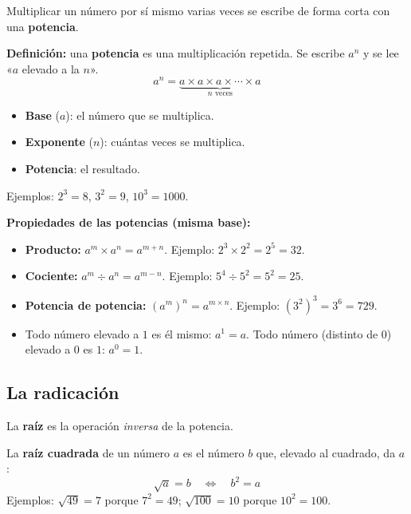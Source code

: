 \documentclass[12pt, letterpaper]{article}
\begin{document}
Multiplicar un número por sí mismo varias veces se escribe de forma corta con una \textbf{potencia}.

\begin{cuadroteoria}
  \textbf{Definición:} una \textbf{potencia} es una multiplicación repetida. Se escribe $a^n$ y se lee «$a$ elevado a la $n$».
  \[
    a^n = \underbrace{a \times a \times a \times \cdots \times a}_{n \text{ veces}}
  \]
  \begin{itemize}[leftmargin=*]
    \item \textbf{Base} ($a$): el número que se multiplica.
    \item \textbf{Exponente} ($n$): cuántas veces se multiplica.
    \item \textbf{Potencia}: el resultado.
  \end{itemize}
  Ejemplos: $2^3 = 8$, \quad $3^2 = 9$, \quad $10^3 = 1000$.
\end{cuadroteoria}

\begin{cuadroteoria}
  \textbf{Propiedades de las potencias (misma base):}
  \begin{itemize}[leftmargin=*]
    \item \textbf{Producto:} $a^m \times a^n = a^{m+n}$. Ejemplo: $2^3 \times 2^2 = 2^5 = 32$.
    \item \textbf{Cociente:} $a^m \div a^n = a^{m-n}$. Ejemplo: $5^4 \div 5^2 = 5^2 = 25$.
    \item \textbf{Potencia de potencia:} $(a^m)^n = a^{m\times n}$. Ejemplo: $(3^2)^3 = 3^6 = 729$.
    \item Todo número elevado a $1$ es él mismo: $a^1 = a$. \quad Todo número (distinto de $0$) elevado a $0$ es $1$: $a^0 = 1$.
  \end{itemize}
\end{cuadroteoria}

\subsection{La radicación}

La \textbf{raíz} es la operación \emph{inversa} de la potencia.

\begin{cuadroteoria}
  La \textbf{raíz cuadrada} de un número $a$ es el número $b$ que, elevado al cuadrado, da $a$:
  \[
    \sqrt{a} = b \quad \Longleftrightarrow \quad b^2 = a
  \]
  Ejemplos: $\sqrt{49} = 7$ porque $7^2 = 49$; \quad $\sqrt{100} = 10$ porque $10^2 = 100$.
\end{cuadroteoria}
\end{document}
